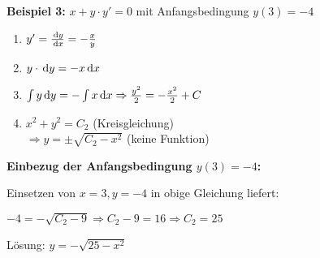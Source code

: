 \begin{multicols}{2}
    \textbf{Beispiel 3:} $x + y \cdot y' = 0$ mit Anfangsbedingung $y(3) = -4$
    \begin{enumerate}
        \item $y' = \frac{\,\mathrm{d}y}{\,\mathrm{d}x} = - \frac{x}{y}$
        \item $y \cdot \,\mathrm{d}y = -x \,\mathrm{d}x$
        \item $\int y \,\mathrm{d}y = - \int x \,\mathrm{d}x \Rightarrow \frac{y^2}{2} = - \frac{x^2}{2} + C$
        \item $x^2 + y^2 = C_2$ (Kreisgleichung) \\
        $\Rightarrow y = \pm \sqrt {C_2 - x^2}$ (keine Funktion)
    \end{enumerate}
    \textbf{Einbezug der Anfangsbedingung $y(3) = -4$:}

    Einsetzen von $x = 3, y = -4$ in obige Gleichung liefert:

    $-4 = - \sqrt {C_2 - 9} \Rightarrow C_2 - 9 = 16 \Rightarrow C_2 = 25$

    Lösung: $y = - \sqrt {25 - x^2}$
\end{multicols}

\begin{comment}
    \begin{definition}{Autonome Differentialgleichungen}
        Eine Differentialgleichung heisst \emph{autonom}, wenn sie sich in der folgenden Form darstellen lässt: \[y' = f(y)\]
    \end{definition}

    \textbf{Beispiele}
    \begin{center}
        \begin{tabular}{|l|l|}
            \hline
            \multicolumn{1}{|c|}{ Gleichung }            & Autonom?                                                      \\
            \hline
            $y' = y^2 + 6$                               & Ja $\Rightarrow f(y) = y^2 + 6$                               \\
            \hline
            $y' = x + y$                                 & Nein                                                          \\
            \hline
            $y' = \frac{y}{x}$                           & Nein                                                          \\
            \hline
            $y' = y^2 \cdot \sqrt{1 - \sin(y)} - \ln(y)$ & Ja $\Rightarrow f(y) = y^2 \cdot \sqrt{1 - \sin(y)} - \ln(y)$ \\
            \hline
        \end{tabular}
    \end{center}

    \textbf{Lösungsmethode:} Diese Differentialgleichungen sind separierbar!
\end{comment}

